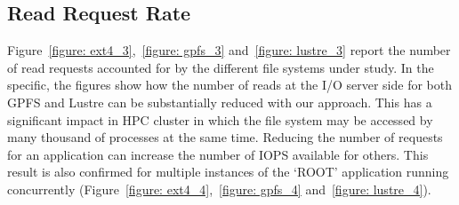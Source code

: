
\subsection{Read Request Rate}
\label{subsec: reads}
Figure~\ref{figure: ext4_3},~\ref{figure: gpfs_3} and~\ref{figure: lustre_3} report the number of read requests accounted for by the different file systems under study. In the specific, the figures show how the number of reads at the I/O server side for both GPFS and Lustre can be substantially reduced with our approach. This has a significant impact in HPC cluster in which the file system may be accessed by many thousand of processes at the same time. Reducing the number of requests for an application can increase the number of IOPS available for others. This result is also confirmed for multiple instances of the `ROOT' application running concurrently (Figure~\ref{figure: ext4_4},~\ref{figure: gpfs_4} and~\ref{figure: lustre_4}).

